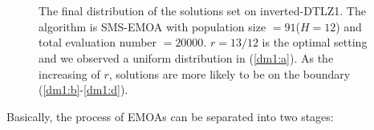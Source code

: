 \documentclass[conference]{IEEEtran}
\begin{document}
\begin{figure}[!t]
  \centering
  \quad
  \\
  \quad
  \\
  \caption{The final distribution of the solutions set on inverted-DTLZ1.
  The algorithm is SMS-EMOA with population size $=91$($H=12$) and total evaluation number $=20000$.
  $r=13/12$ is the optimal setting and we observed a uniform distribution in (\ref{dm1:a}).
  As the increasing of $r$, solutions are more likely to be on the boundary
  (\ref{dm1:b}-\ref{dm1:d}). 
  }
  \label{dm1}
\end{figure}

%
% 
Basically, the process of EMOAs can be separated into
two stages:
\end{document}
